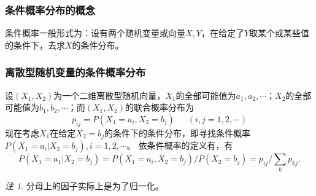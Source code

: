 \documentclass[a4paper,11pt]{article}%
\theoremstyle{remark}
\newtheorem*{remark}{注}
\theoremstyle{remark}
\theoremstyle{definition}
\theoremstyle{definition}
\theoremstyle{plain}
\begin{document}
\subsubsection{条件概率分布的概念}
条件概率一般形式为：设有两个随机变量或向量$X,Y$，在给定了$Y$取某个或某些值的条件下，去求$X$的条件分布。
\subsubsection{离散型随机变量的条件概率分布}
设$(X_1,X_2)$为一个二维离散型随机向量，$X_1$的全部可能值为$a_1,a_2,\cdots$；$X_2$的全部可能值为$b_1,b_2,\cdots$；而$(X_1,X_2)$的联合概率分布为
\[p _{ij}=P(X_1=a_i,X_2=b_j)\phantom{111}(i,j=1,2,\cdots)\]
现在考虑$X_1$在给定$X_2=b_j$的条件下的条件分布，即寻找条件概率$P(X_1=a_i|X_2=b_j),i=1,2,\cdots$。
依条件概率的定义有，有
\[P(X_1=a_1|X_2=b_j)=P(X_1=a_i,X_2=b_j)/P(X_2=b_j)=p _{ij}/\sum_kp_{kj}.\]
\begin{remark}
    分母上的因子实际上是为了归一化。
\end{remark}
\end{document}
